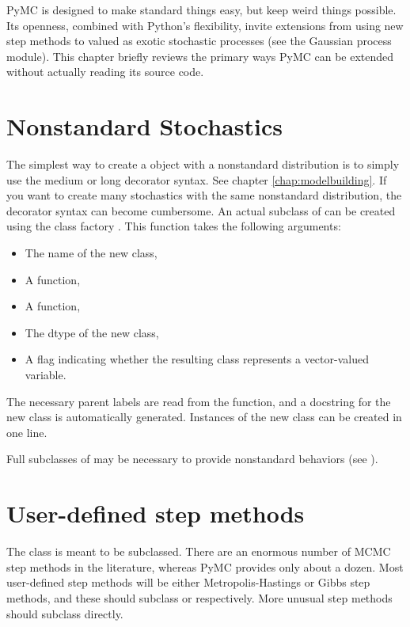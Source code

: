 PyMC is designed to make standard things easy, but keep weird things possible. Its openness, combined with Python's flexibility, invite extensions from using new step methods to  valued as exotic stochastic processes (see the Gaussian process module). This chapter briefly reviews the primary ways PyMC can be extended without actually reading its source code. 

\hypertarget{nonstandard}{}
\section*{Nonstandard Stochastics} \label{nonstandard}

The simplest way to create a  object with a nonstandard distribution is to simply use the medium or long decorator syntax. See chapter \ref{chap:modelbuilding}. If you want to create many stochastics with the same nonstandard distribution, the decorator syntax can become cumbersome. An actual subclass of  can be created using the class factory . This function takes the following arguments:
\begin{itemize}
   \item The name of the new class,
   \item A  function,
   \item A  function,
   \item The dtype of the new class,
   \item A flag indicating whether the resulting class represents a vector-valued variable.
\end{itemize}
The necessary parent labels are read from the  function, and a docstring for the new class is automatically generated. Instances of the new class can be created in one line.

Full subclasses of  may be necessary to provide nonstandard behaviors (see ).

\hypertarget{custom-stepper}{}
\section*{User-defined step methods} \label{custom-stepper}
The  class is meant to be subclassed. There are an enormous number of MCMC step methods in the literature, whereas PyMC provides only about a dozen. Most user-defined step methods will be either Metropolis-Hastings or Gibbs step methods, and these should subclass  or  respectively. More unusual step methods should subclass  directly.

